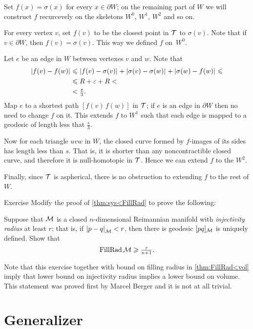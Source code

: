 Set $f(x)=\sigma(x)$ for every $x\in \partial W$;
on the remaining part of $W$ we will construct $f$ recurcevely on the skeletons $W^0$, $W^1$, $W^2$ and so on.

For every vertex $v$, set $f(v)$ to be the closest point in $\mathcal{T}$ to $\sigma(v)$.
Note that if $v\in\partial W$, then $f(v)=\sigma(v)$.
This way we defined $f$ on~$W^0$.

Let $e$ be an edge in $W$ between vertexes $v$ and $w$.
Note that 
\begin{align*}
\dist{f(v)}{f(w)}{}
&\le\dist{f(v)}{\sigma(v)}{}
+\dist{\sigma(v)}{\sigma(w)}{}
+\dist{\sigma(w)}{f(w)}{}\le
\\
&\le R+\eps +R<
\\
&<\tfrac s3.
\end{align*}
Map $e$ to a shortest path $[f(v)\,f(w)]$ in $\mathcal{T}$;
if $e$ is an edge in $\partial W$ then no need to change $f$ on it.
This extends $f$ to $W^1$ such that each edge is mapped to a geodesic of length less that $\tfrac s3$.

Now for each triangle $uvw$ in $W$, the closed curve formed by $f$-images of its sides has length less than $s$.
That is, it is shorter than any noncontractible closed curve,
and therefore it is null-homotopic in $\mathcal{T}$.
Hence we can extend $f$ to the $W^2$.

Finally, since $\mathcal{T}$ is aspherical, there is no obstruction to extending $f$ to the rest of $W$.
\qeds

\begin{thm}{Exercise}\label{ex:fillrad-inj}
Modify the proof of \ref{thm:sys<FillRad} to prove the following:

Suppose that $\mathcal{M}$ is a closed $n$-dimensional Reimannian manifold with \emph{injectivity radius} at least $r$; that is, if $\dist{p}{q}{\spc{M}}<r$, then there is geodesic $[pq]_{\mathcal{M}}$ is uniquely defined.
Show that
\[\operatorname{\rm FillRad}\mathcal{M}\geqslant \tfrac{r}{n+1}.\]
 
\end{thm}

Note that this exercise together with bound on filling radius in \ref{thm:FillRad<vol} imply that lower bound on injectivity radius implies a lower bound on volume.
This statement was proved first by Marcel Berger \cite{berger} and it is not at all trivial.

\section{Generalizer}

